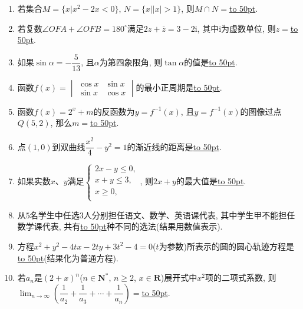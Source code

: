 \documentclass[10pt,a4paper]{article}
\newcommand{\blank}[1]{\underline{\hbox to #1pt{}}}
\begin{document}
\begin{enumerate}[1.]
\item 若集合$M=\{x|{x^2}-2x<0\}$, $N=\{x||x|>1\}$, 则$M\cap N=$\blank{50}.
\item 若复数$\angle OFA+\angle OFB={180^\circ}$满足$2z+\overline z=3-2\mathrm{i}$, 其中$\mathrm{i}$为虚数单位, 则$z=$\blank{50}.
\item 如果$\sin \alpha =-\dfrac5{13}$, 且$\alpha$为第四象限角, 则$\tan \alpha$的值是\blank{50}.
\item 函数$f(x)=\begin{vmatrix}   \cos x & \sin x  \\    \sin x & \cos x \end{vmatrix}$的最小正周期是\blank{50}.
\item 函数$f(x)=2^x+m$的反函数为$y=f^{-1}(x)$, 且$y=f^{-1}(x)$的图像过点$Q(5,2)$, 那么$m=$\blank{50}.
\item 点$(1,0)$到双曲线$\dfrac{x^2}4-y^2=1$的渐近线的距离是\blank{50}.
\item 如果实数$x$、$y$满足$\begin{cases} 2x-y\le 0, \\ x+y\le 3, \\  x\ge 0, \\ \end{cases}$, 则$2x+y$的最大值是\blank{50}.
\item 从$5$名学生中任选$3$人分别担任语文、数学、英语课代表, 其中学生甲不能担任数学课代表, 共有\blank{50}种不同的选法(结果用数值表示).
\item 方程$x^2+y^2-4tx-2ty+3t^2-4=0$($t$为参数)所表示的圆的圆心轨迹方程是\blank{50}(结果化为普通方程).
\item 若$a_n$是$(2+x)^n$($n\in \mathbf{N}^*$, $n\ge 2$, $x\in \mathbf{R}$)展开式中$x^2$项的二项式系数, 则$\displaystyle\lim_{n\to\infty}(\dfrac 1{a_2}+\dfrac 1{a_3}+\cdots+\dfrac1{a_n})=$\blank{50}.



\end{enumerate}
\end{document}
